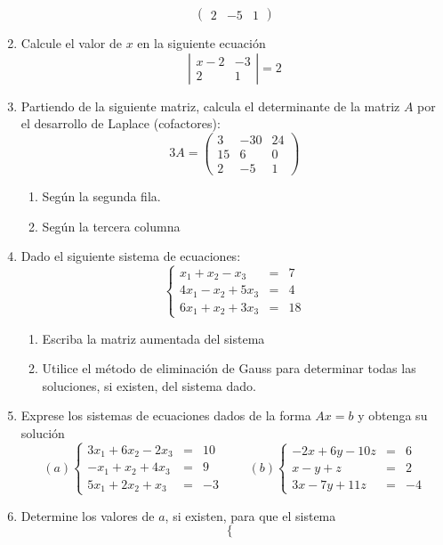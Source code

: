 \documentclass[12pt]{article}
\begin{document}
\begin{enumerate}
$$\begin{pmatrix}
  2 & -5 & 1
\end{pmatrix}
$$
\item Calcule el valor de $x$ en la siguiente ecuación
$$
\left|\begin{array}{cc}
  x-2 & -3\\
  2 & 1
\end{array}\right|=2
$$
\item Partiendo de la siguiente matriz, calcula el determinante de la matriz $A$ por el desarrollo de Laplace (cofactores):
$$
3A = \begin{pmatrix}
  3 & -30 & 24\\
  15 & 6 & 0\\
  2 & -5 & 1
\end{pmatrix}
$$
\begin{enumerate}
  \item Según la segunda fila.
  \item Según la tercera columna
\end{enumerate}
\item Dado el siguiente sistema de ecuaciones:
$$
\left\{\begin{array}{rcl}
  x_1+x_2-x_3 & = & 7\\
  4x_1-x_2+5x_3 & = & 4\\
  6x_1+x_2+3x_3 & = & 18
  \end{array}\right.
$$
\begin{enumerate}
  \item Escriba la matriz aumentada del sistema
  \item Utilice el método de eliminación de Gauss para determinar todas las soluciones, si existen, del sistema dado.
\end{enumerate}
\item Exprese los sistemas de ecuaciones dados de la forma $Ax=b$ y obtenga su solución
$$
(a) \left\{\begin{array}{rcl}
  3x_1+6x_2-2x_3 & = & 10\\
  -x_1+x_2+4x_3 & = & 9\\
  5x_1+2x_2+x_3 & = & -3
  \end{array}\right. \qquad (b)\left\{\begin{array}{rcl}
  -2x+6y-10z & = & 6\\
  x-y+z & = & 2\\
  3x-7y+11z & = & -4
  \end{array}\right.
$$
\item Determine los valores de $a$, si existen, para que el sistema
$$
\left\{\begin{array}{rcl}

\end{array}$$
\end{enumerate}
\end{document}
